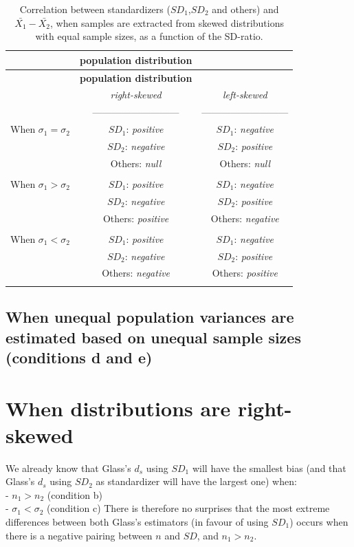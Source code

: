 \documentclass[
  man]{apa6}
\begin{document}
\begin{longtable}[]{@{}lcc@{}}
\caption{Correlation between standardizers (\(SD_1\),\(SD_2\) and others) and \(\bar{X_1}-\bar{X_2}\), when samples are extracted from skewed distributions with equal sample sizes, as a function of the SD-ratio.}\tabularnewline
\toprule
& \textbf{\textbf{population distribution}} &\tabularnewline
\midrule
\endfirsthead
\toprule
& \textbf{\textbf{population distribution}} &\tabularnewline
\midrule
\endhead
& \emph{right-skewed} & \emph{left-skewed}\tabularnewline
& --------------------------- & ---------------------------\tabularnewline
When \(\sigma_1=\sigma_2\) & \(SD_1\): \emph{positive} & \(SD_1\): \emph{negative}\tabularnewline
& \(SD_2\): \emph{negative} & \(SD_2\): \emph{positive}\tabularnewline
& Others: \emph{null} & Others: \emph{null}\tabularnewline
& &\tabularnewline
When \(\sigma_1>\sigma_2\) & \(SD_1\): \emph{positive} & \(SD_1\): \emph{negative}\tabularnewline
& \(SD_2\): \emph{negative} & \(SD_2\): \emph{positive}\tabularnewline
& Others: \emph{positive} & Others: \emph{negative}\tabularnewline
& &\tabularnewline
When \(\sigma_1<\sigma_2\) & \(SD_1\): \emph{positive} & \(SD_1\): \emph{negative}\tabularnewline
& \(SD_2\): \emph{negative} & \(SD_2\): \emph{positive}\tabularnewline
& Others: \emph{negative} & Others: \emph{positive}\tabularnewline
& &\tabularnewline
\bottomrule
\end{longtable}

\hypertarget{when-unequal-population-variances-are-estimated-based-on-unequal-sample-sizes-conditions-d-and-e}{%
\subsection{When unequal population variances are estimated based on unequal sample sizes (conditions d and e)}\label{when-unequal-population-variances-are-estimated-based-on-unequal-sample-sizes-conditions-d-and-e}}

\hypertarget{when-distributions-are-right-skewed}{%
\section{When distributions are right-skewed}\label{when-distributions-are-right-skewed}}

We already know that Glass's \(d_s\) using \(SD_1\) will have the smallest bias (and that Glass's \(d_s\) using \(SD_2\) as standardizer will have the largest one) when:\\
- \(n_1 > n_2\) (condition b)\\
- \(\sigma_1 < \sigma_2\) (condition c)
There is therefore no surprises that the most extreme differences between both Glass's estimators (in favour of using \(SD_1\)) occurs when there is a negative pairing between \(n\) and \(SD\), and \(n_1 > n_2\).
\end{document}
